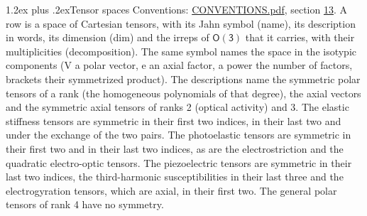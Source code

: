 \documentclass[10pt,a4paper]{article}
\makeatletter
\renewcommand\section{\@startsection{section}{1}{\z@}{-3ex plus -1ex minus -.2ex}%
  {1.2ex plus .2ex}{\normalfont\large\sffamily\bfseries\color{parttitle}}}
\numberwithin{equation}{section}
\newcommand{\grp}[1]{\mathsf{#1}}
\makeatother
\begin{document}
\section{Tensor spaces}\label{s:tensor_spaces}
Conventions: \href{../../CONVENTIONS.pdf}{CONVENTIONS.pdf}, section \href{../../CONVENTIONS.pdf\#conv.13}{13}.
\leavevmode\label{n:head.name}\label{n:head.description}\label{n:head.dim}\label{n:head.decomposition}A row is a space of Cartesian tensors, with its Jahn symbol (name), its description in words, its dimension (dim) and the irreps of $\grp{O(3)}$ that it carries, with their multiplicities (decomposition). \label{n:label.jahn}The same symbol names the space in the isotypic components (V a polar vector, e an axial factor, a power the number of factors, brackets their symmetrized product). The descriptions name the symmetric polar tensors of a rank (the homogeneous polynomials of that degree), the axial vectors and the symmetric axial tensors of ranks 2 (optical activity) and 3. The elastic stiffness tensors are symmetric in their first two indices, in their last two and under the exchange of the two pairs. The photoelastic tensors are symmetric in their first two and in their last two indices, as are the electrostriction and the quadratic electro-optic tensors. The piezoelectric tensors are symmetric in their last two indices, the third-harmonic susceptibilities in their last three and the electrogyration tensors, which are axial, in their first two. The general polar tensors of rank 4 have no symmetry.
\end{document}
